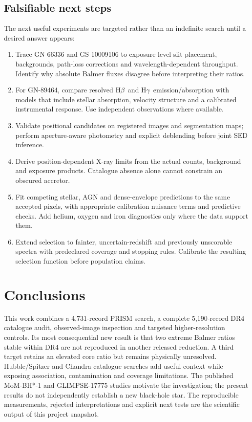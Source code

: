 \documentclass[11pt,a4paper]{article}
\newcommand{\hb}{H$\beta$}
\newcommand{\hg}{H$\gamma$}
\begin{document}
\subsection{Falsifiable next steps}
The next useful experiments are targeted rather than an indefinite search until a desired answer appears:
\begin{enumerate}
\item Trace GN-66336 and GS-10009106 to exposure-level slit placement, backgrounds, path-loss corrections and wavelength-dependent throughput. Identify why absolute Balmer fluxes disagree before interpreting their ratios.
\item For GN-89464, compare resolved \hb\ and \hg\ emission/absorption with models that include stellar absorption, velocity structure and a calibrated instrumental response. Use independent observations where available.
\item Validate positional candidates on registered images and segmentation maps; perform aperture-aware photometry and explicit deblending before joint SED inference.
\item Derive position-dependent X-ray limits from the actual counts, background and exposure products. Catalogue absence alone cannot constrain an obscured accretor.
\item Fit competing stellar, AGN and dense-envelope predictions to the same accepted pixels, with appropriate calibration nuisance terms and predictive checks. Add helium, oxygen and iron diagnostics only where the data support them.
\item Extend selection to fainter, uncertain-redshift and previously unscorable spectra with predeclared coverage and stopping rules. Calibrate the resulting selection function before population claims.
\end{enumerate}

\section{Conclusions}
This work combines a 4,731-record PRISM search, a complete 5,190-record DR4 catalogue audit, observed-image inspection and targeted higher-resolution controls. Its most consequential new result is that two extreme Balmer ratios stable within DR4 are not reproduced in another released reduction. A third target retains an elevated core ratio but remains physically unresolved. Hubble/Spitzer and Chandra catalogue searches add useful context while exposing association, contamination and coverage limitations. The published MoM-BH*-1 and GLIMPSE-17775 studies motivate the investigation; the present results do not independently establish a new black-hole star. The reproducible measurements, rejected interpretations and explicit next tests are the scientific output of this project snapshot.
\end{document}
